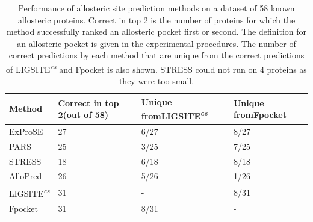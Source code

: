 \begin{table}
\centering

\begin{tabular}{ p{3cm} p{3cm} p{3cm} p{3cm} }
\hline
\textbf{Method} & \textbf{Correct in top 2\newline (out of 58)} & \textbf{Unique from\newline LIGSITE\textsuperscript{\it cs}} & \textbf{Unique from\newline Fpocket} \\
\hline
ExProSE                         & 27 & 6/27 & 8/27 \\
PARS                            & 25 & 3/25 & 7/25 \\
STRESS                          & 18 & 6/18 & 8/18 \\
AlloPred                        & 26 & 5/26 & 1/26 \\
LIGSITE\textsuperscript{\it cs} & 31 & -    & 8/31 \\
Fpocket                         & 31 & 8/31 & -    \\
\hline
\end{tabular}

\caption{Performance of allosteric site prediction methods on a dataset of 58 known allosteric proteins.
Correct in top 2 is the number of proteins for which the method successfully ranked an allosteric pocket first or second.
The definition for an allosteric pocket is given in the experimental procedures.
The number of correct predictions by each method that are unique from the correct predictions of LIGSITE\textsuperscript{\it cs} and Fpocket is also shown.
STRESS could not run on 4 proteins as they were too small.}

\label{tab:allosteric_methods}
\end{table}


